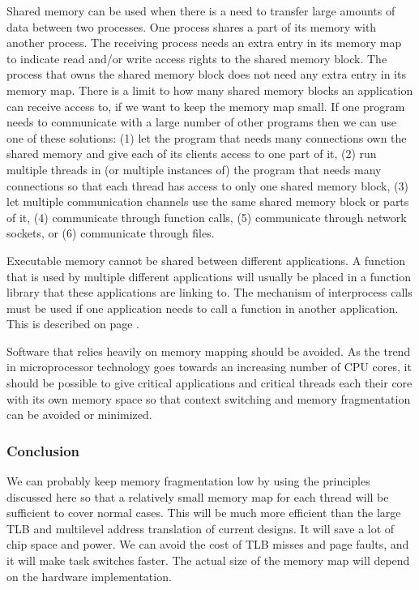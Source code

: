 \documentclass[forwardcom.tex]{subfiles}
\begin{document}
\label{sharedMemory} Shared memory can be used when there is a need to transfer large amounts of data between two processes. One process shares a part of its memory with another process. The receiving process needs an extra entry in its memory map to indicate read and/or write access rights to the shared memory block. The process that owns the shared memory block does not need any extra entry in its memory map. There is a limit to how many shared memory blocks an application can receive access to, if we want to keep the memory map small. If one program needs to communicate with a large number of other programs then we can use one of these solutions: (1) let the program that needs many connections own the shared memory and give each of its clients access to one part of it, (2) run multiple threads in (or multiple instances of) the program that needs many connections so that each thread has access to only one shared memory block, (3) let multiple communication channels use the same shared memory block or parts of it, (4) communicate through function calls, (5) communicate through network sockets, or (6) communicate through files. 
\vv

Executable memory cannot be shared between different applications. A function that is used by multiple different applications will usually be placed in a function library that these applications are linking to. 
The mechanism of interprocess calls must be used if one application needs to call a function in another application. This is described on page \pageref{interProcessCalls}. 
\vv

Software that relies heavily on memory mapping should be avoided. As the trend in microprocessor technology goes towards an increasing number of CPU cores, it should be possible to give critical applications and critical threads each their core with its own memory space so that context switching and memory fragmentation can be avoided or minimized.
\vv


\subsubsection{Conclusion} \label{MemoryManagementConclusion}
We can probably keep memory fragmentation low by using the principles discussed here so that a relatively small memory map for each thread will be sufficient to cover normal cases. This will be much more efficient than the large TLB and multilevel address translation of current designs. It will save a lot of chip space and power.  We can avoid the cost of TLB misses and page faults, and it will make task switches faster. The actual size of the memory map will depend on the hardware implementation.
\vv
\end{document}
